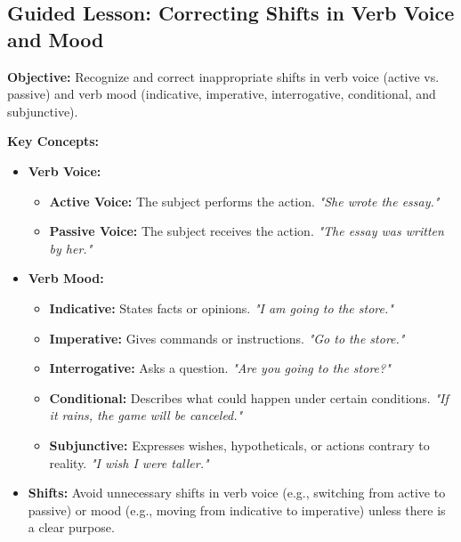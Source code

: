 \documentclass[12pt]{article}
\title{}
\date{}
\begin{document}
\subsection*{Guided Lesson: Correcting Shifts in Verb Voice and Mood}
\onehalfspacing

\begin{tcolorbox}[colframe=black!40, colback=gray!5, 
coltitle=black, colbacktitle=black!20, fonttitle=\bfseries\Large, 
title=Learning Objective, halign title=center, left=5pt, right=5pt, top=5pt, bottom=15pt]
\textbf{Objective:} Recognize and correct inappropriate shifts in verb voice (active vs. passive) and verb mood (indicative, imperative, interrogative, conditional, and subjunctive).
\end{tcolorbox}

\vspace{1em}

\begin{tcolorbox}[colframe=black!60, colback=white, 
coltitle=black, colbacktitle=black!15, fonttitle=\bfseries\Large, 
title=Key Concepts and Vocabulary, halign title=center, left=10pt, right=10pt, top=10pt, bottom=15pt]
\textbf{Key Concepts:}
\begin{itemize}
    \item \textbf{Verb Voice:}
    \begin{itemize}
        \item \textbf{Active Voice:} The subject performs the action. \textit{"She wrote the essay."}
        \item \textbf{Passive Voice:} The subject receives the action. \textit{"The essay was written by her."}
    \end{itemize}
    \item \textbf{Verb Mood:}
    \begin{itemize}
        \item \textbf{Indicative:} States facts or opinions. \textit{"I am going to the store."}
        \item \textbf{Imperative:} Gives commands or instructions. \textit{"Go to the store."}
        \item \textbf{Interrogative:} Asks a question. \textit{"Are you going to the store?"}
        \item \textbf{Conditional:} Describes what could happen under certain conditions. \textit{"If it rains, the game will be canceled."}
        \item \textbf{Subjunctive:} Expresses wishes, hypotheticals, or actions contrary to reality. \textit{"I wish I were taller."}
    \end{itemize}
    \item \textbf{Shifts:} 
    Avoid unnecessary shifts in verb voice (e.g., switching from active to passive) or mood (e.g., moving from indicative to imperative) unless there is a clear purpose.
\end{itemize}
\end{tcolorbox}
\end{document}
